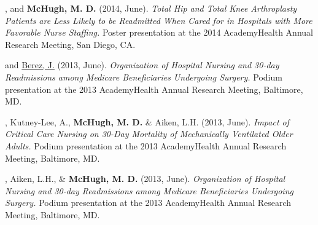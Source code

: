 \documentclass[10pt,]{article}
\begin{document}
{{{{{{{{{{{{{{\begin{hangparas}{.25in}{1}
\end{hangparas}

\vspace{4mm}

\begin{hangparas}{.25in}{1}

, and {\textbf {McHugh, M. D.}} (2014, June). {\textit {Total Hip and Total Knee Arthroplasty Patients are Less Likely to be Readmitted When Cared for in Hospitals with More Favorable Nurse Staffing.}} Poster presentation at the 2014 AcademyHealth Annual Research Meeting, San Diego, CA.

\end{hangparas}

\vspace{4mm}

\begin{hangparas}{.25in}{1}

 and {\underline {Berez, J.}} (2013, June). {\textit {Organization of Hospital Nursing and 30-day Readmissions among Medicare Beneficiaries Undergoing Surgery.}} Podium presentation at the 2013 AcademyHealth Annual Research Meeting, Baltimore, MD.

\end{hangparas}

\vspace{4mm}

\begin{hangparas}{.25in}{1}

, Kutney-Lee, A., {\textbf {McHugh, M. D.}} \& Aiken, L.H. (2013, June). {\textit {Impact of Critical Care Nursing on 30-Day Mortality of Mechanically Ventilated Older Adults.}} Podium presentation at the 2013 AcademyHealth Annual Research Meeting, Baltimore, MD.

\end{hangparas}

\vspace{4mm}

\begin{hangparas}{.25in}{1}

, Aiken, L.H., \& {\textbf {McHugh, M. D.}} (2013, June). {\textit {Organization of Hospital Nursing and 30-day Readmissions among Medicare Beneficiaries Undergoing Surgery.}} Podium presentation at the 2013 AcademyHealth Annual Research Meeting, Baltimore, MD.

\end{hangparas}

}}}}}}}}}}}}}}
\end{document}
